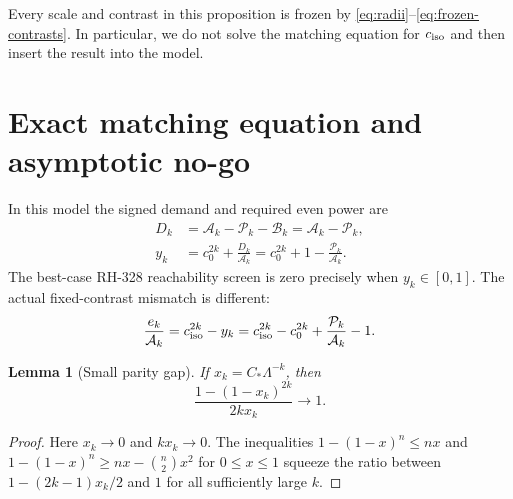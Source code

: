 \documentclass[11pt]{article}
\newtheorem{lemma}[theorem]{Lemma}
\theoremstyle{remark}
\newcommand{\cA}{\mathcal A}
\newcommand{\cB}{\mathcal B}
\newcommand{\cP}{\mathcal P}
\begin{document}
Every scale and contrast in this proposition is frozen by
\eqref{eq:radii}--\eqref{eq:frozen-contrasts}.  In particular, we do not
solve the matching equation for $c_{\rm iso}$ and then insert the result into
the model.

\section{Exact matching equation and asymptotic no-go}

In this model the signed demand and required even power are
\begin{align}
 D_k&=\cA_k-\cP_k-\cB_k=\cA_k-\cP_k,
 \label{eq:demand}\\
 y_k&=c_0^{2k}+\frac{D_k}{\cA_k}
 =c_0^{2k}+1-\frac{\cP_k}{\cA_k}.
 \label{eq:required-power}
\end{align}
The best-case RH-328 reachability screen is zero precisely when
$y_k\in[0,1]$.  The actual fixed-contrast mismatch is different:
\begin{equation}
 \frac{e_k}{\cA_k}
 =c_{\rm iso}^{2k}-y_k
 =c_{\rm iso}^{2k}-c_0^{2k}
   +\frac{\cP_k}{\cA_k}-1.
 \label{eq:normalized-residual}
\end{equation}

\begin{lemma}[Small parity gap]
If $x_k=C_*\Lambda^{-k}$, then
\begin{equation}
 \frac{1-(1-x_k)^{2k}}{2kx_k}\longrightarrow1.
 \label{eq:binomial-limit}
\end{equation}
\end{lemma}

\begin{proof}
Here $x_k\to0$ and $kx_k\to0$.  The inequalities
$1-(1-x)^n\le nx$ and
$1-(1-x)^n\ge nx-\binom n2x^2$ for $0\le x\le1$ squeeze the ratio between
$1-(2k-1)x_k/2$ and $1$ for all sufficiently large $k$.
\end{proof}
\end{document}
